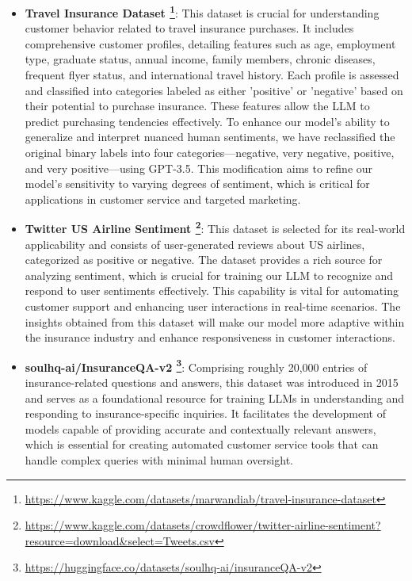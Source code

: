 \documentclass[conference]{IEEEtran}
\begin{document}
\begin{itemize}
    \item \textbf{Travel Insurance Dataset \footnote{\url{https://www.kaggle.com/datasets/marwandiab/travel-insurance-dataset}}}: This dataset is crucial for understanding customer behavior related to travel insurance purchases. It includes comprehensive customer profiles, detailing features such as age, employment type, graduate status, annual income, family members, chronic diseases, frequent flyer status, and international travel history. Each profile is assessed and classified into categories labeled as either 'positive' or 'negative' based on their potential to purchase insurance. These features allow the LLM to predict purchasing tendencies effectively. To enhance our model's ability to generalize and interpret nuanced human sentiments, we have reclassified the original binary labels into four categories—negative, very negative, positive, and very positive—using GPT-3.5. This modification aims to refine our model's sensitivity to varying degrees of sentiment, which is critical for applications in customer service and targeted marketing.

    \item \textbf{Twitter US Airline Sentiment \footnote{\url{https://www.kaggle.com/datasets/crowdflower/twitter-airline-sentiment?resource=download&select=Tweets.csv}}}: This dataset is selected for its real-world applicability and consists of user-generated reviews about US airlines, categorized as positive or negative. The dataset provides a rich source for analyzing sentiment, which is crucial for training our LLM to recognize and respond to user sentiments effectively. This capability is vital for automating customer support and enhancing user interactions in real-time scenarios. The insights obtained from this dataset will make our model more adaptive within the insurance industry and enhance responsiveness in customer interactions.

    \item \textbf{soulhq-ai/InsuranceQA-v2 \footnote{\url{https://huggingface.co/datasets/soulhq-ai/insuranceQA-v2}}}: Comprising roughly 20,000 entries of insurance-related questions and answers, this dataset was introduced in 2015 and serves as a foundational resource for training LLMs in understanding and responding to insurance-specific inquiries. It facilitates the development of models capable of providing accurate and contextually relevant answers, which is essential for creating automated customer service tools that can handle complex queries with minimal human oversight.
\end{itemize}
\end{document}

